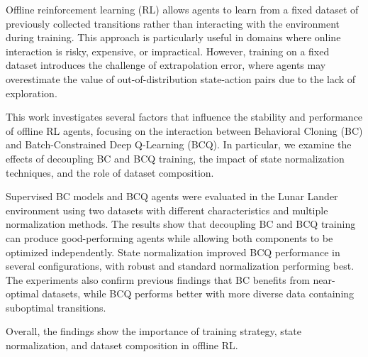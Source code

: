 
\cleardoubleoddpage%
\begin{abstract*}


Offline reinforcement learning (RL) allows agents to learn from a fixed dataset of previously collected transitions rather than interacting with the environment during training. This approach is particularly useful in domains where online interaction is risky, expensive, or impractical. However, training on a fixed dataset introduces the challenge of extrapolation error, where agents may overestimate the value of out-of-distribution state-action pairs due to the lack of exploration.

This work investigates several factors that influence the stability and performance of offline RL agents, focusing on the interaction between Behavioral Cloning (BC) and Batch-Constrained Deep Q-Learning (BCQ). In particular, we examine the effects of decoupling BC and BCQ training, the impact of state normalization techniques, and the role of dataset composition.

Supervised BC models and BCQ agents were evaluated in the Lunar Lander environment using two datasets with different characteristics and multiple normalization methods. The results show that decoupling BC and BCQ training can produce good-performing agents while allowing both components to be optimized independently. State normalization improved BCQ performance in several configurations, with robust and standard normalization performing best. The experiments also confirm previous findings that BC benefits from near-optimal datasets, while BCQ performs better with more diverse data containing suboptimal transitions.

Overall, the findings show the importance of training strategy, state normalization, and dataset composition in offline RL.







\end{abstract*}





